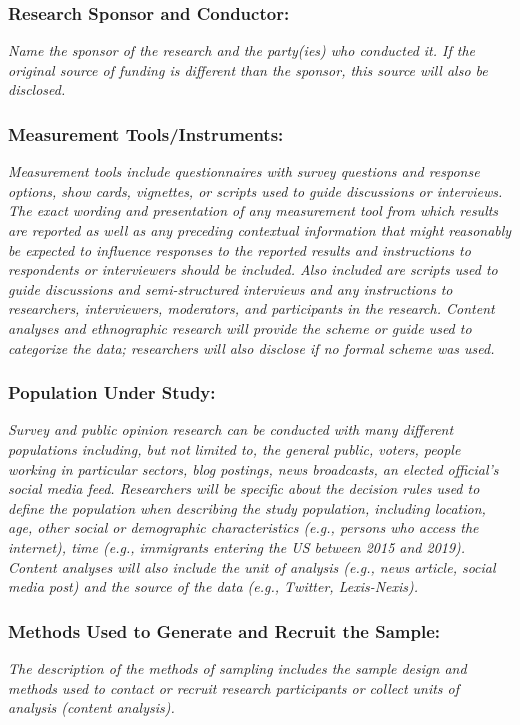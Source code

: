 \documentclass{article}
\begin{document}
\subsubsection*{Research Sponsor and Conductor:} \textit{Name the sponsor of the research and the party(ies) who conducted it. If the original source of funding is different than the sponsor, this source will also be disclosed.}



\subsubsection*{Measurement Tools/Instruments:} \textit{Measurement tools include questionnaires with survey questions and response options, show cards, vignettes, or scripts used to guide discussions or interviews. The exact wording and presentation of any measurement tool from which results are reported as well as any preceding contextual information that might reasonably be expected to influence responses to the reported results and instructions to respondents or interviewers should be included. Also included are scripts used to guide discussions and semi-structured interviews and any instructions to researchers, interviewers, moderators, and participants in the research. Content analyses and ethnographic research will provide the scheme or guide used to categorize the data; researchers will also disclose if no formal scheme was used.}



\subsubsection*{Population Under Study:} \textit{Survey and public opinion research can be conducted with many different populations including, but not limited to, the general public, voters, people working in particular sectors, blog postings, news broadcasts, an elected official's social media feed. Researchers will be specific about the decision rules used to define the population when describing the study population, including location, age, other social or demographic characteristics (e.g., persons who access the internet), time (e.g., immigrants entering the US between 2015 and 2019). Content analyses will also include the unit of analysis (e.g., news article, social media post) and the source of the data (e.g., Twitter, Lexis-Nexis).}



\subsubsection*{Methods Used to Generate and Recruit the Sample:} \textit{The description of the methods of sampling includes the sample design and methods used to contact or recruit research participants or collect units of analysis (content analysis).}
\end{document}
